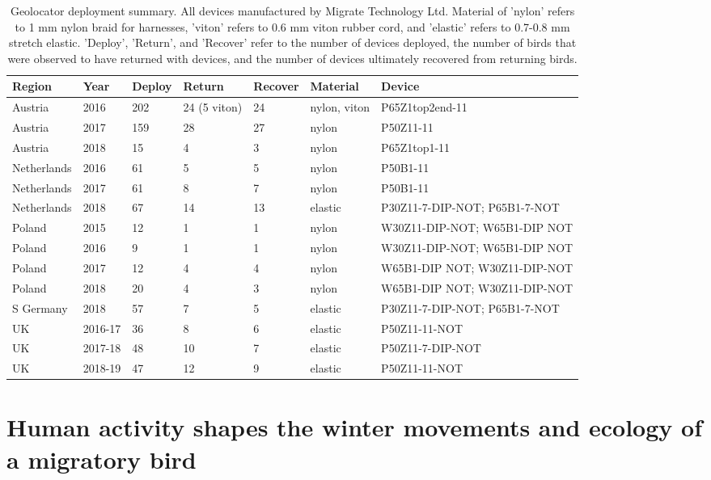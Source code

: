 \documentclass[a4paper, twoside]{templates/ociamthesis}
\begin{document}
\begin{table}[t]

\caption{\label{tab:capture-recapture-table}Geolocator deployment summary. All devices manufactured by Migrate Technology Ltd. Material of 'nylon' refers to 1 mm nylon braid for harnesses, 'viton' refers to 0.6 mm viton rubber cord, and 'elastic' refers to 0.7-0.8 mm stretch elastic. 'Deploy', 'Return', and 'Recover' refer to the number of devices deployed, the number of birds that were observed to have returned with devices, and the number of devices ultimately recovered from returning birds.}
\centering
\fontsize{9.5}{11.5}\selectfont
\begin{tabular}{l|l|l|l|l|l|>{\raggedright\arraybackslash}p{9em}}
\hline
Region & Year & Deploy & Return & Recover & Material & Device\\
\hline
Austria & 2016 & 202 & 24 (5 viton) & 24 & nylon, viton & P65Z1top2end-11\\
\hline
Austria & 2017 & 159 & 28 & 27 & nylon & P50Z11-11\\
\hline
Austria & 2018 & 15 & 4 & 3 & nylon & P65Z1top1-11\\
\hline
Netherlands & 2016 & 61 & 5 & 5 & nylon & P50B1-11\\
\hline
Netherlands & 2017 & 61 & 8 & 7 & nylon & P50B1-11\\
\hline
Netherlands & 2018 & 67 & 14 & 13 & elastic & P30Z11-7-DIP-NOT; P65B1-7-NOT\\
\hline
Poland & 2015 & 12 & 1 & 1 & nylon & W30Z11-DIP-NOT; W65B1-DIP NOT\\
\hline
Poland & 2016 & 9 & 1 & 1 & nylon & W30Z11-DIP-NOT; W65B1-DIP NOT\\
\hline
Poland & 2017 & 12 & 4 & 4 & nylon & W65B1-DIP NOT; W30Z11-DIP-NOT\\
\hline
Poland & 2018 & 20 & 4 & 3 & nylon & W65B1-DIP NOT; W30Z11-DIP-NOT\\
\hline
S Germany & 2018 & 57 & 7 & 5 & elastic & P30Z11-7-DIP-NOT; P65B1-7-NOT\\
\hline
UK & 2016-17 & 36 & 8 & 6 & elastic & P50Z11-11-NOT\\
\hline
UK & 2017-18 & 48 & 10 & 7 & elastic & P50Z11-7-DIP-NOT\\
\hline
UK & 2018-19 & 47 & 12 & 9 & elastic & P50Z11-11-NOT\\
\hline
\end{tabular}
\end{table}

\hypertarget{blackcap-uk}{%
\chapter{Human activity shapes the winter movements and ecology of a migratory bird}\label{blackcap-uk}}
\end{document}
